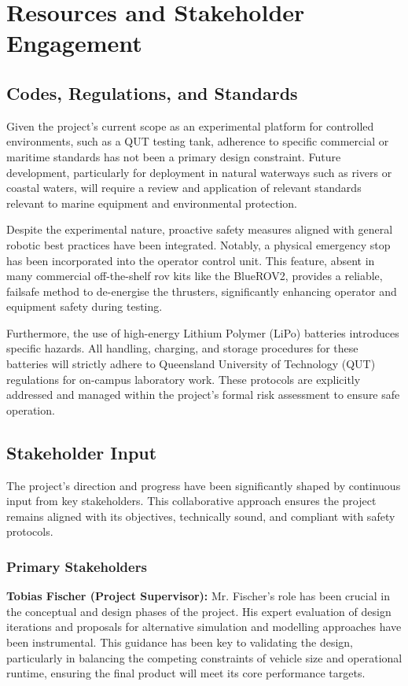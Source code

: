 \documentclass[11pt, a4paper]{article}
\begin{document}
\section{Resources and Stakeholder Engagement}
\label{sec:resources}

\subsection{Codes, Regulations, and Standards}
Given the project's current scope as an experimental platform for controlled environments, such as a QUT testing tank, adherence to specific commercial or maritime standards has not been a primary design constraint. Future development, particularly for deployment in natural waterways such as rivers or coastal waters, will require a review and application of relevant standards relevant to marine equipment and environmental protection.

Despite the experimental nature, proactive safety measures aligned with general robotic best practices have been integrated. Notably, a physical emergency stop has been incorporated into the operator control unit. This feature, absent in many commercial off-the-shelf \gls{rov} kits like the BlueROV2, provides a reliable, failsafe method to de-energise the thrusters, significantly enhancing operator and equipment safety during testing.

Furthermore, the use of high-energy Lithium Polymer (LiPo) batteries introduces specific hazards. All handling, charging, and storage procedures for these batteries will strictly adhere to Queensland University of Technology (QUT) regulations for on-campus laboratory work. These protocols are explicitly addressed and managed within the project's formal risk assessment to ensure safe operation.

\subsection{Stakeholder Input}
The project's direction and progress have been significantly shaped by continuous input from key stakeholders. This collaborative approach ensures the project remains aligned with its objectives, technically sound, and compliant with safety protocols.

\subsubsection{Primary Stakeholders}
\textbf{Tobias Fischer (Project Supervisor):} Mr. Fischer's role has been crucial in the conceptual and design phases of the project. His expert evaluation of design iterations and proposals for alternative simulation and modelling approaches have been instrumental. This guidance has been key to validating the design, particularly in balancing the competing constraints of vehicle size and operational runtime, ensuring the final product will meet its core performance targets.
\end{document}
